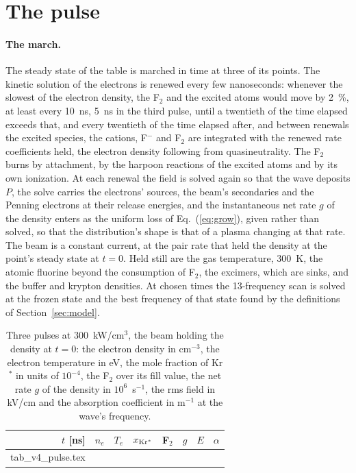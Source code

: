 \documentclass[11pt]{article}
\makeatletter
\newcommand{\tabinput}[1]{\@@input #1 }
\makeatother
\begin{document}
\section{The pulse}
\label{sec:pulse}

\paragraph{The march.}
The steady state of the table is marched in time at three of its points. The kinetic solution of the electrons is
renewed every few nanoseconds: whenever the slowest of the electron density, the F$_2$ and the excited atoms would
move by 2~\%, at least every 10~ns, 5~ns in the third pulse, until a twentieth of the time elapsed exceeds that,
and every twentieth of the time elapsed after, and between renewals the excited species, the cations, F$^-$ and F$_2$ are
integrated with the renewed rate coefficients held, the electron density following from quasineutrality. The
F$_2$ burns by attachment, by the harpoon reactions of the excited atoms and by its own ionization. At each renewal
the field is solved again so that the wave deposits $P$, the solve carries the electrons' sources, the beam's
secondaries and the Penning electrons at their release energies, and the instantaneous net rate $g$ of the density
enters as the uniform loss of Eq.~(\ref{eq:grow}), given rather than solved, so that the distribution's shape is
that of a plasma changing at that rate. The beam is a constant current, at the pair rate that held the density at
the point's steady state at $t=0$. Held still are the gas temperature, 300~K, the atomic fluorine beyond the
consumption of F$_2$, the excimers, which are sinks, and the buffer and krypton densities. At chosen times the
13-frequency scan is solved at the frozen state and the best frequency of that state found by the definitions of
Section~\ref{sec:model}.

\begin{table}[!tbp]
\caption{Three pulses at 300~kW/cm$^3$, the beam holding the density at $t=0$: the electron density in cm$^{-3}$,
the electron temperature in eV, the mole fraction of Kr$^*$ in units of $10^{-4}$, the F$_2$ over its fill value,
the net rate $g$ of the density in $10^6$~s$^{-1}$, the rms field in kV/cm and the absorption coefficient in m$^{-1}$
at the wave's frequency.}
\label{tab:pulse}
\centering
\small
\begin{tabular}{@{}rrrrrrrr@{}}
\toprule
$t$ [ns] & $n_e$ & $T_e$ & $x_{{\rm Kr}^*}$ & F$_2$ & $g$ & $E$ & $\alpha$ \\
\midrule
\tabinput{tab_v4_pulse.tex}
\bottomrule
\end{tabular}
\end{table}
\end{document}
